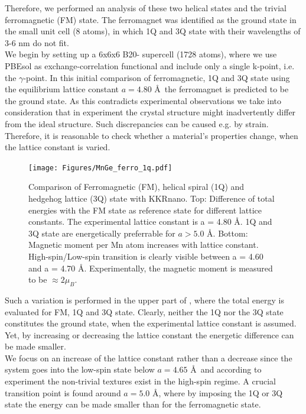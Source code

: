 \documentclass [a4paper, 12pt]{article}
\begin{document}
Therefore, we performed
an analysis of these two helical states and the trivial ferromagnetic (FM) state.
The ferromagnet was identified as the ground state in the small unit cell (8 atoms), 
in which 1Q and 3Q state with their wavelengths of
3-6 nm do not fit.
\\
We begin by setting up a 6x6x6 B20- supercell (1728 atoms), where we use PBEsol 
as exchange-correlation functional
and include only a single k-point, i.e. the $\gamma$-point.
In this initial comparison of ferromagnetic, 1Q and 3Q state using the equilibrium lattice constant
$a=4.80$ \AA \, the ferromagnet is predicted to be the ground state.
As this contradicts experimental observations we take into consideration that
in experiment the crystal structure might inadvertently differ from the ideal structure.
Such discrepancies can be caused e.g. by strain.
\\
Therefore, it is reasonable to check whether a material's properties change, when the
lattice constant is varied.
\begin{figure}[h]
\begin{center}
 \texttt{[image: Figures/MnGe\_ferro\_1q.pdf]}
\end{center}
\caption{
	Comparison of Ferromagnetic (FM), helical spiral (1Q) and hedgehog lattice (3Q) state with KKRnano.
	Top: Difference of total energies with the FM state as reference state for different lattice constants. 
	The experimental lattice constant is a = 4.80 \AA. 1Q and 3Q state are energetically preferrable 
	for $a > 5.0$ \AA. Bottom: Magnetic moment per Mn atom increases with lattice constant. 
	High-spin/Low-spin transition is clearly visible between a = 4.60 and a = 4.70 \AA.
	Experimentally, the magnetic moment is measured to be $\approx 2 \mu_{B}$.
	}
\label{fig:MnGe_ferro_1q}
\end{figure}
Such a variation is performed in the upper part of , where
the total energy is evaluated for FM, 1Q and 3Q state.
Clearly, neither the 1Q nor the 3Q state constitutes the ground state,
when the experimental lattice constant is assumed.
Yet, by increasing or decreasing the lattice constant the energetic difference can be made
smaller.
\\
We focus on an increase of the lattice constant rather than a decrease since 
the system goes into the low-spin state below $a=4.65$ \AA \, and according to experiment
the non-trivial textures
exist in the high-spin regime.
A crucial transition point is found around $a=5.0$ \AA,
where by imposing the 1Q or 3Q state the energy can be made smaller than for the ferromagnetic state.
\end{document}
